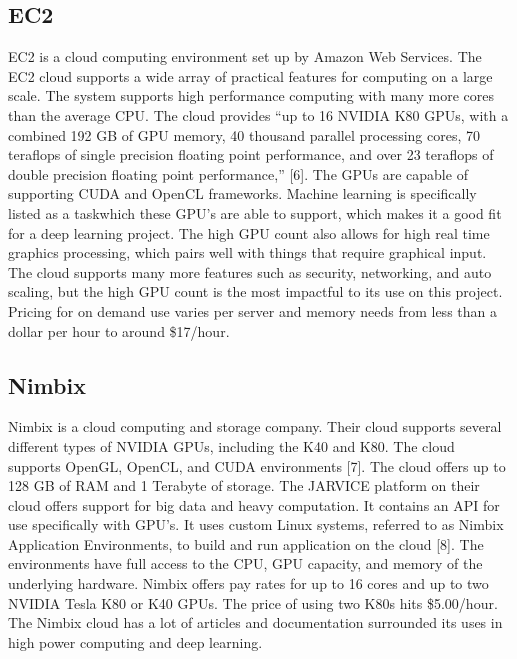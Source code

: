 \documentclass{scrreprt}
\begin{document}
\subsection{EC2}
EC2 is a cloud computing environment set up by Amazon Web Services. The EC2 cloud
supports a wide array of practical features for computing on a large scale. The system supports
high performance computing with many more cores than the average CPU. The cloud provides
“up to 16 NVIDIA K80 GPUs, with a combined 192 GB of GPU memory, 40 thousand parallel
processing cores, 70 teraflops of single precision floating point performance, and over 23
teraflops of double precision floating point performance,” [6]. The GPUs are capable of
supporting CUDA and OpenCL frameworks. Machine learning is specifically listed as a taskwhich these GPU’s are able to support, which makes it a good fit for a deep learning project. The
high GPU count also allows for high real time graphics processing, which pairs well with things
that require graphical input. The cloud supports many more features such as security,
networking, and auto scaling, but the high GPU count is the most impactful to its use on this
project. Pricing for on demand use varies per server and memory needs from less than a dollar
per hour to around \$17/hour.

\subsection{Nimbix}
Nimbix is a cloud computing and storage company. Their cloud supports several different types
of NVIDIA GPUs, including the K40 and K80. The cloud supports OpenGL, OpenCL, and
CUDA environments [7]. The cloud offers up to 128 GB of RAM and 1 Terabyte of storage. The
JARVICE platform on their cloud offers support for big data and heavy computation. It contains
an API for use specifically with GPU’s. It uses custom Linux systems, referred to as Nimbix
Application Environments, to build and run application on the cloud [8]. The environments have
full access to the CPU, GPU capacity, and memory of the underlying hardware. Nimbix offers
pay rates for up to 16 cores and up to two NVIDIA Tesla K80 or K40 GPUs. The price of using
two K80s hits \$5.00/hour. The Nimbix cloud has a lot of articles and documentation surrounded
its uses in high power computing and deep learning.
\end{document}
